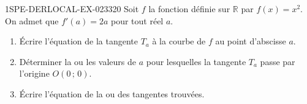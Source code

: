 \begin{exercice}{1SPE-DERLOCAL-EX-023}{3}{20}
Soit $f$ la fonction définie sur $\mathbb{R}$ par $f(x) = x^2$. On admet que $f'(a) = 2a$ pour tout réel $a$.

\begin{enumerate}
  \item Écrire l'équation de la tangente $T_a$ à la courbe de $f$ au point d'abscisse $a$.
  \item Déterminer la ou les valeurs de $a$ pour lesquelles la tangente $T_a$ passe par l'origine $O(0\,;\,0)$.
  \item Écrire l'équation de la ou des tangentes trouvées.
\end{enumerate}
\end{exercice}
